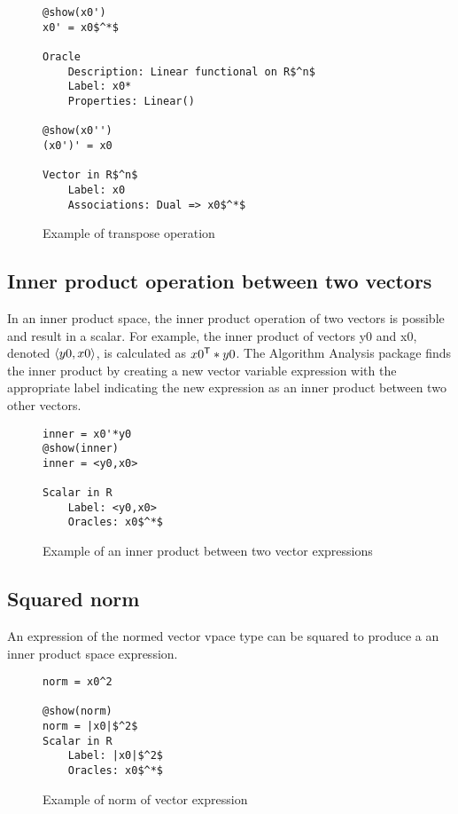 \begin{figure}[!h]
	\begin{lstlisting}[mathescape]
@show(x0')
x0' = x0$^*$

Oracle
	Description: Linear functional on R$^n$
	Label: x0*
	Properties: Linear()

@show(x0'')
(x0')' = x0

Vector in R$^n$
	Label: x0
	Associations: Dual => x0$^*$
	\end{lstlisting}
	\caption{Example of transpose operation}
	\label{ex_transpose}
\end{figure}

\subsection*{Inner product operation between two vectors}
In an inner product space, the inner product operation of two vectors is possible and result in a scalar. For example, the inner product of vectors y0 and x0, denoted $\langle y0, x0 \rangle$, is calculated as $x0^{\mathsf{T}} * y0$. The Algorithm Analysis package finds the inner product by creating a new vector variable expression with the appropriate label indicating the new expression as an inner product between two other vectors.
\begin{figure}[!h]
	\begin{lstlisting}[mathescape]
inner = x0'*y0
@show(inner)
inner = <y0,x0>

Scalar in R
	Label: <y0,x0>
	Oracles: x0$^*$

	\end{lstlisting}
	\caption{Example of an inner product between two vector expressions}
	\label{ex_inner}
\end{figure}

\subsection*{Squared norm}
An expression of the normed vector vpace type can be squared to produce a an inner product space expression.
\begin{figure}[!h]
	\begin{lstlisting}[mathescape]
norm = x0^2

@show(norm)
norm = |x0|$^2$
Scalar in R
	Label: |x0|$^2$
	Oracles: x0$^*$
\end{lstlisting}
\caption{Example of norm of vector expression}
\label{ex_norm}
\end{figure}


